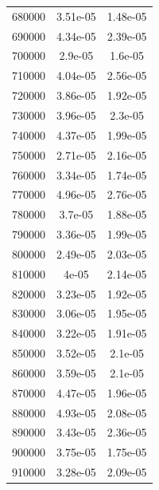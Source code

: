 \documentclass{article}
\begin{document}
\begin{longtable}{c|c|c}
           680000 &               3.51e-05 &               1.48e-05 \\
           690000 &               4.34e-05 &               2.39e-05 \\
           700000 &               2.9e-05  &               1.6e-05  \\
           710000 &               4.04e-05 &               2.56e-05 \\
           720000 &               3.86e-05 &               1.92e-05 \\
           730000 &               3.96e-05 &               2.3e-05  \\
           740000 &               4.37e-05 &               1.99e-05 \\
           750000 &               2.71e-05 &               2.16e-05 \\
           760000 &               3.34e-05 &               1.74e-05 \\
           770000 &               4.96e-05 &               2.76e-05 \\
           780000 &               3.7e-05  &               1.88e-05 \\
           790000 &               3.36e-05 &               1.99e-05 \\
           800000 &               2.49e-05 &               2.03e-05 \\
           810000 &               4e-05    &               2.14e-05 \\
           820000 &               3.23e-05 &               1.92e-05 \\
           830000 &               3.06e-05 &               1.95e-05 \\
           840000 &               3.22e-05 &               1.91e-05 \\
           850000 &               3.52e-05 &               2.1e-05  \\
           860000 &               3.59e-05 &               2.1e-05  \\
           870000 &               4.47e-05 &               1.96e-05 \\
           880000 &               4.93e-05 &               2.08e-05 \\
           890000 &               3.43e-05 &               2.36e-05 \\
           900000 &               3.75e-05 &               1.75e-05 \\
           910000 &               3.28e-05 &               2.09e-05 \\

\end{longtable}
\end{document}
